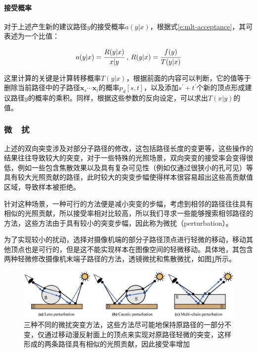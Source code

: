 \paragraph{接受概率}
对于上述产生新的建议路径${y}$的接受概率$a({y}|{x})$，根据式\ref{e:mlt-acceptance}，其可表述为一个比值：

\begin{equation}
	a({y}|{x})= \cfrac{R({y}|{x})}{{x}|{y}}\text{ , } R({y}|{x})= \cfrac{f({y})}{T({y}|{x})}
\end{equation}

这里计算的关键是计算转移概率$T({y}|{x})$，根据前面的内容可以判断，它的值等于删除当前路径中的子路径$\mathbf{x}_s\cdots\mathbf{x}_t$的概率$p_d[s,t]$，以及添加$s^{'}+t^{'}$个新的顶点形成建议路径${y}$的概率的乘积。同样，根据这些参数的反向设定，可以求出$T({x}|{y})$的值。



\subsubsection{微~~扰}
上述的双向突变涉及对部分子路径的修改，这包括路径长度的变更等，这些操作的结果往往导致较大的突变，对于一些特殊的光照场景，双向突变的接受率会变得很低，例如一些包含焦散效果以及具有复杂可见性（例如仅通过很狭小的孔可见）等具有较大光照贡献的路径，此时较大的突变步幅使得样本很容易超出这些高贡献值区域，导致样本被拒绝。

针对这种场景，一种可行的方法便是减小突变的步幅，考虑到相邻的路径往往具有相似的光照贡献，所以接受率相对比较高，所以我们寻求一些能够搜索相邻路径的方法，这些方法由于具有较小的突变步幅，因此称为微扰（perturbation）。

为了实现较小的扰动，\cite{a:MetropolisLightTransport}选择对摄像机端的部分子路径顶点进行轻微的移动，移动其他顶点也是可行的，但是这不能实现样本在图像空间的轻微移动。具体地，其包含两种轻微修改摄像机末端子路径的方法，透镜微扰和焦散微扰，如图\ref{f:mlt-mutations}所示。

\begin{figure}
\begin{fullwidth}
	\includegraphics[width=1.0\thewidth]{figures/mlt/mutations}
	\caption{三种不同的微扰突变方法，这些方法尽可能地保持原路径的一部分不变，仅通过移动漫反射面上的顶点来实现对原路径轻微的突变，这样形成的两条路径具有相似的光照贡献，因此接受率增加}
	\label{f:mlt-mutations}
\end{fullwidth}
\end{figure}



